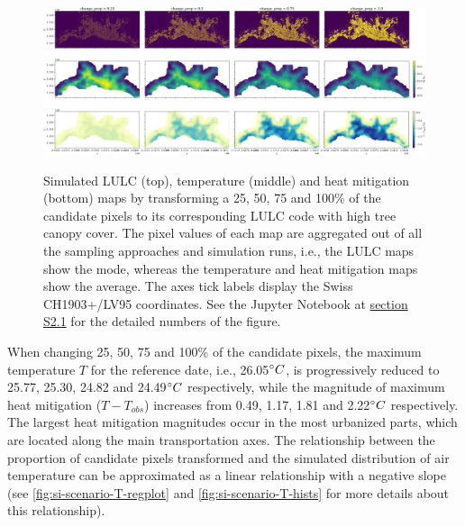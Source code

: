 \documentclass[10pt,letterpaper]{article}
\begin{document}
\begin{figure}
  \begin{adjustwidth}{-.4\textwidth}{0cm}
    \includegraphics[width=\linewidth]{figures/scenario-lulc-maps.png}
    \includegraphics[width=\linewidth]{figures/scenario-T-maps.png}
    \includegraphics[width=\linewidth]{figures/scenario-heat-mitigation-maps.png}
    \caption{\label{fig:scenario-maps} Simulated LULC (top), temperature (middle) and heat mitigation (bottom) maps by transforming a 25, 50, 75 and 100\% of the candidate pixels to its corresponding LULC code with high tree canopy cover. The pixel values of each map are aggregated out of all the sampling approaches and simulation runs, i.e., the LULC maps show the mode, whereas the temperature and heat mitigation maps show the average. The axes tick labels display the Swiss CH1903+/LV95 coordinates. See the Jupyter Notebook at \hyperref[sec:si-scenarios]{section S2.1} for the detailed numbers of the figure.}
  \end{adjustwidth}
\end{figure}
When changing 25, 50, 75 and 100\% of the candidate pixels, the maximum temperature $T$ for the reference date, i.e., 26.05$\degree C$, is progressively reduced to 25.77, 25.30, 24.82 and 24.49$\degree C$ respectively, while the magnitude of maximum heat mitigation ($T - T_{obs}$) increases from 0.49, 1.17, 1.81 and 2.22$\degree C$ respectively.
The largest heat mitigation magnitudes occur in the most urbanized parts, which are located along the main transportation axes.
The relationship between the proportion of candidate pixels transformed and the simulated distribution of air temperature can be approximated as a linear relationship with a negative slope (see \autoref{fig:si-scenario-T-regplot} and \autoref{fig:si-scenario-T-hists} for more details about this relationship).
\end{document}
